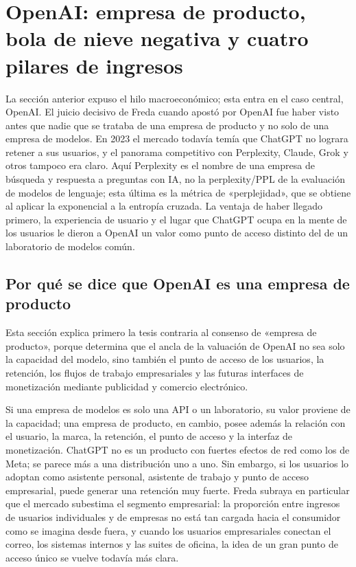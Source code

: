\section{OpenAI: empresa de producto, bola de nieve negativa y cuatro pilares de ingresos}

La sección anterior expuso el hilo macroeconómico; esta entra en el caso central, OpenAI. El juicio decisivo de Freda cuando apostó por OpenAI fue haber visto antes que nadie que se trataba de una empresa de producto y no solo de una empresa de modelos. En 2023 el mercado todavía temía que ChatGPT no lograra retener a sus usuarios, y el panorama competitivo con Perplexity, Claude, Grok y otros tampoco era claro. Aquí Perplexity es el nombre de una empresa de búsqueda y respuesta a preguntas con IA, no la perplexity/PPL de la evaluación de modelos de lenguaje; esta última es la métrica de «perplejidad», que se obtiene al aplicar la exponencial a la entropía cruzada. La ventaja de haber llegado primero, la experiencia de usuario y el lugar que ChatGPT ocupa en la mente de los usuarios le dieron a OpenAI un valor como punto de acceso distinto del de un laboratorio de modelos común.

\subsection{Por qué se dice que OpenAI es una empresa de producto}

Esta sección explica primero la tesis contraria al consenso de «empresa de producto», porque determina que el ancla de la valuación de OpenAI no sea solo la capacidad del modelo, sino también el punto de acceso de los usuarios, la retención, los flujos de trabajo empresariales y las futuras interfaces de monetización mediante publicidad y comercio electrónico.

Si una empresa de modelos es solo una API o un laboratorio, su valor proviene de la capacidad; una empresa de producto, en cambio, posee además la relación con el usuario, la marca, la retención, el punto de acceso y la interfaz de monetización. ChatGPT no es un producto con fuertes efectos de red como los de Meta; se parece más a una distribución uno a uno. Sin embargo, si los usuarios lo adoptan como asistente personal, asistente de trabajo y punto de acceso empresarial, puede generar una retención muy fuerte. Freda subraya en particular que el mercado subestima el segmento empresarial: la proporción entre ingresos de usuarios individuales y de empresas no está tan cargada hacia el consumidor como se imagina desde fuera, y cuando los usuarios empresariales conectan el correo, los sistemas internos y las suites de oficina, la idea de un gran punto de acceso único se vuelve todavía más clara.

